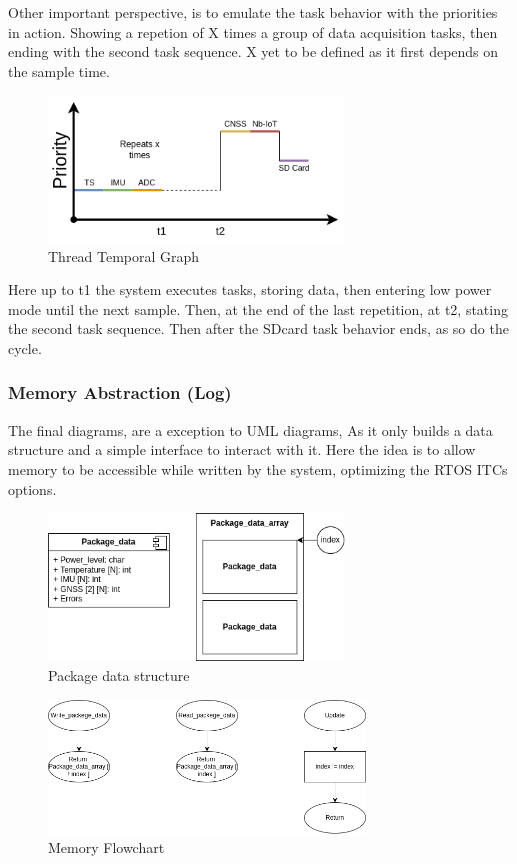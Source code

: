 Other important perspective, is to emulate the task behavior with the priorities in action. 
Showing a repetion of X times a group of data acquisition tasks, then ending with the second task sequence.
X yet to be defined as it first depends on the sample time. 
\begin{figure}[H]
    \centering
    \includegraphics[width=0.7\textwidth]{images/diagrams/threads/graph/threads_graph.drawio.png}  %
    \caption{Thread Temporal Graph}
    \label{fig:Thread Temporal Graph}        
\end{figure}

Here up to t1 the system executes tasks, storing data, then entering low power mode until the next sample.
Then, at the end of the last repetition, at t2, stating the second task sequence. Then after the SDcard task behavior ends, as so do the cycle.
\subsubsection{Memory Abstraction (Log)} 

The final diagrams, are a exception to UML diagrams, As it only builds a data structure and a simple interface to interact with it.
Here the idea is to allow memory to be accessible while written by the system, optimizing the RTOS ITCs options.
\begin{figure}[H]
    \centering
    \includegraphics[width=0.7\textwidth]{images/diagrams/data_struct/package_data.drawio.png}  %
    \caption{Package data structure}
    \label{fig:Package data structure}        
\end{figure}


\begin{figure}[H]
    \centering
    \includegraphics[width=0.75\textwidth]{images/diagrams/data_struct/fluxogram.png}  %
    \caption{Memory Flowchart}
    \label{fig:Memory Flowchart}        
\end{figure}
